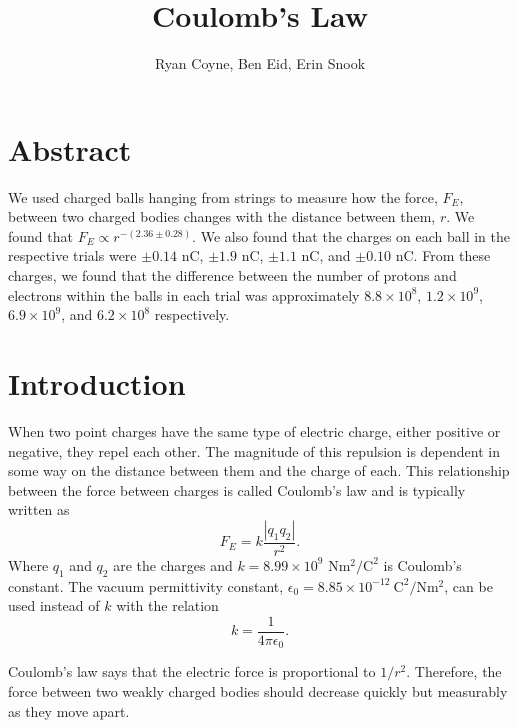 \documentclass[12pt]{article}
\begin{document}
    \title{Coulomb's Law}
    \author{Ryan Coyne, Ben Eid, Erin Snook}
    \maketitle
    \section{Abstract}
        We used charged balls hanging from strings to measure how the force, \(F_E\), between two charged bodies changes with the distance between them, \(r\). We found that \(F_E \propto r^{-(2.36 \pm 0.28)}\). We also found that the charges on each ball in the respective trials were \(\pm 0.14\) nC, \(\pm 1.9\) nC, \(\pm 1.1\) nC, and \(\pm 0.10\) nC. From these charges, we found that the difference between the number of protons and electrons within the balls in each trial was approximately \(8.8 \times 10^8\), \(1.2 \times 10^9\), \(6.9\times 10^9\), and \(6.2\times 10^8\) respectively.

    \section{Introduction}
        When two point charges have the same type of electric charge, either positive or negative, they repel each other. The magnitude of this repulsion is dependent in some way on the distance between them and the charge of each. This relationship between the force between charges is called Coulomb's law and is typically written as 
        \begin{equation}
            F_E = k\frac{|q_1q_2|}{r^2}.
        \end{equation}
        Where \(q_1\) and \(q_2\) are the charges and \(k=8.99\times 10^9\) \(\mathrm{Nm^2/C^2}\) is Coulomb's constant.  The vacuum permittivity constant, \(\epsilon_0=8.85\times 10^{-12}\ \mathrm{C^2/Nm^2}\), can be used instead of \(k\) with the relation
        \begin{equation}
            k = \frac{1}{4\pi \epsilon_0}.
        \end{equation} 

        Coulomb's law says that the electric force is proportional to \(1/r^2\). Therefore, the force between two weakly charged bodies should decrease quickly but measurably as they move apart.
\end{document}
